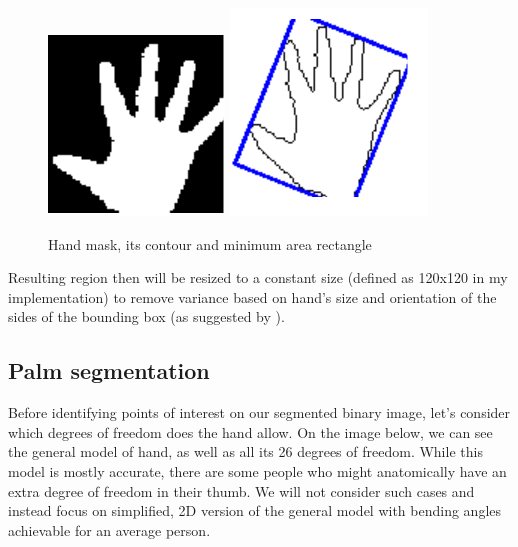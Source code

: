\documentclass[a4paper,11pt,oneside]{article}
\begin{document}
\begin{figure}[H]
\centering
\includegraphics[scale=1.5]{hand-mask.png}
\includegraphics[scale=1.5]{hand-box.png}
\caption{Hand mask, its contour and minimum area rectangle}
\end{figure}

Resulting region then will be resized to a constant size (defined as 120x120 in my implementation) to remove variance based on hand's size and orientation of the sides of the bounding box (as suggested by \cite{HI01}).

\subsection{Palm segmentation}

Before identifying points of interest on our segmented binary image, let's consider which degrees of freedom does the hand allow. On the image below, we can see the general model of hand, as well as all its 26 degrees of freedom. While this model is mostly accurate, there are some people who might anatomically have an extra degree of freedom in their thumb. We will not consider such cases and instead focus on simplified, 2D version of the general model with bending angles achievable for an average person.
\end{document}
